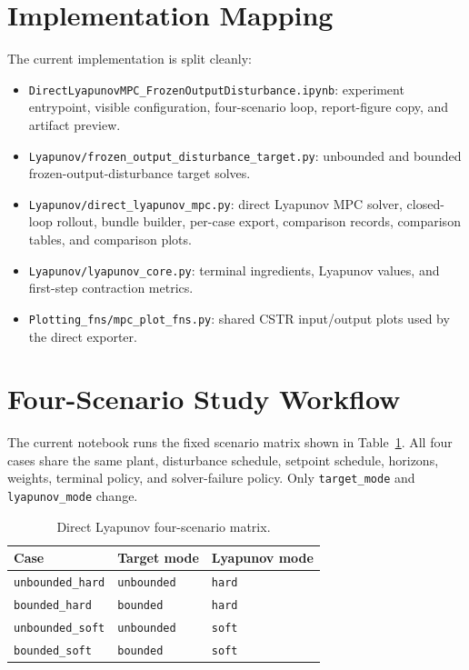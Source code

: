 \documentclass[11pt]{article}
\begin{document}
\section{Implementation Mapping}

The current implementation is split cleanly:
\begin{itemize}[leftmargin=1.5em]
\item \texttt{DirectLyapunovMPC\_FrozenOutputDisturbance.ipynb}: experiment
entrypoint, visible configuration, four-scenario loop, report-figure copy, and
artifact preview.
\item \texttt{Lyapunov/frozen\_output\_disturbance\_target.py}: unbounded and
bounded frozen-output-disturbance target solves.
\item \texttt{Lyapunov/direct\_lyapunov\_mpc.py}: direct Lyapunov MPC solver,
closed-loop rollout, bundle builder, per-case export, comparison records,
comparison tables, and comparison plots.
\item \texttt{Lyapunov/lyapunov\_core.py}: terminal ingredients, Lyapunov
values, and first-step contraction metrics.
\item \texttt{Plotting\_fns/mpc\_plot\_fns.py}: shared CSTR input/output plots
used by the direct exporter.
\end{itemize}

\section{Four-Scenario Study Workflow}

The current notebook runs the fixed scenario matrix shown in
Table~\ref{tab:four_scenario_matrix}. All four cases share the same plant,
disturbance schedule, setpoint schedule, horizons, weights, terminal policy, and
solver-failure policy. Only \texttt{target\_mode} and \texttt{lyapunov\_mode}
change.

\begin{table}[H]
\centering
\caption{Direct Lyapunov four-scenario matrix.}
\label{tab:four_scenario_matrix}
\begin{tabular}{lll}
\toprule
Case & Target mode & Lyapunov mode \\
\midrule
\texttt{unbounded\_hard} & \texttt{unbounded} & \texttt{hard} \\
\texttt{bounded\_hard} & \texttt{bounded} & \texttt{hard} \\
\texttt{unbounded\_soft} & \texttt{unbounded} & \texttt{soft} \\
\texttt{bounded\_soft} & \texttt{bounded} & \texttt{soft} \\
\bottomrule
\end{tabular}
\end{table}
\end{document}

